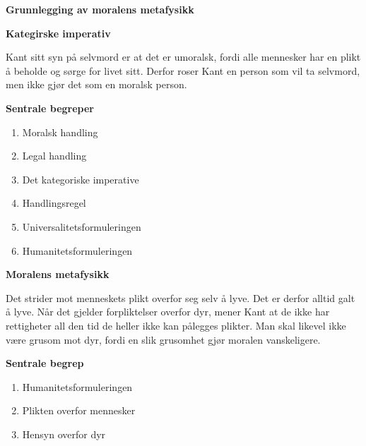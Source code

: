 \documentclass[11pt, a4paper]{article}
\newenvironment{sectionbox}[1][]{%
    \begin{sectionboxinner}
    \textbf{\large #1}
    \vspace{1pt}
    \newline
}{%
    \end{sectionboxinner}
}
\newenvironment{subsectionbox}[1][]{%
    \begin{subsectionboxinner}
    \textbf{#1}
    \vspace{3pt}
    \newline
}{%
    \end{subsectionboxinner}
}
\begin{document}
\begin{sectionbox}[Grunnlegging av moralens metafysikk]
\begin{subsectionbox}[Kategirske imperativ]
Kant sitt syn på selvmord er at det er umoralsk, fordi alle mennesker har en plikt å beholde og sørge for livet sitt. Derfor roser Kant en person som vil ta selvmord, men ikke gjør det som en moralsk person.

\end{subsectionbox}

\begin{subsectionbox}[Sentrale begreper]
\begin{enumerate}
    \item Moralsk handling
    \item Legal handling
    \item Det kategoriske imperative
    \item Handlingsregel
    \item Universalitetsformuleringen
    \item Humanitetsformuleringen
\end{enumerate}
\end{subsectionbox}

\end{sectionbox}


\begin{sectionbox}[Moralens metafysikk]
Det strider mot menneskets plikt overfor seg selv å lyve. Det er derfor alltid galt å lyve. Når det gjelder forpliktelser overfor dyr, mener Kant at de ikke har rettigheter all den tid de heller ikke kan pålegges plikter. Man skal likevel ikke være grusom mot dyr, fordi en slik grusomhet gjør moralen vanskeligere.

\begin{subsectionbox}[Sentrale begrep]
\begin{enumerate}
    \item Humanitetsformuleringen
    \item Plikten overfor mennesker
    \item Hensyn overfor dyr
\end{enumerate}
\end{subsectionbox}

\end{sectionbox}
\end{document}
